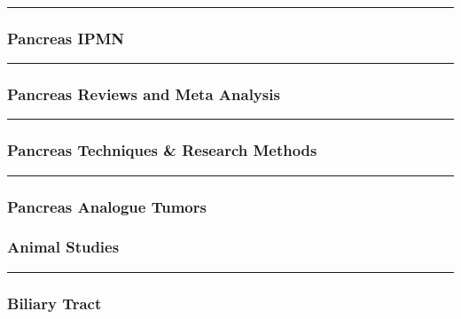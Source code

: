 \documentclass[]{article}
\begin{document}
\begin{center}\rule{0.5\linewidth}{\linethickness}\end{center}

\hypertarget{pancreas-ipmn}{%
\subsubsection{Pancreas IPMN}\label{pancreas-ipmn}}

\begin{center}\rule{0.5\linewidth}{\linethickness}\end{center}

\hypertarget{pancreas-reviews-and-meta-analysis}{%
\subsubsection{Pancreas Reviews and Meta
Analysis}\label{pancreas-reviews-and-meta-analysis}}

\begin{center}\rule{0.5\linewidth}{\linethickness}\end{center}

\hypertarget{pancreas-techniques-research-methods}{%
\subsubsection{Pancreas Techniques \& Research
Methods}\label{pancreas-techniques-research-methods}}

\begin{center}\rule{0.5\linewidth}{\linethickness}\end{center}

\hypertarget{pancreas-analogue-tumors}{%
\subsubsection{Pancreas Analogue
Tumors}\label{pancreas-analogue-tumors}}

\hypertarget{animal-studies}{%
\subsubsection{Animal Studies}\label{animal-studies}}

\begin{center}\rule{0.5\linewidth}{\linethickness}\end{center}

\hypertarget{biliary-tract-3}{%
\subsubsection{Biliary Tract}\label{biliary-tract-3}}
\end{document}
